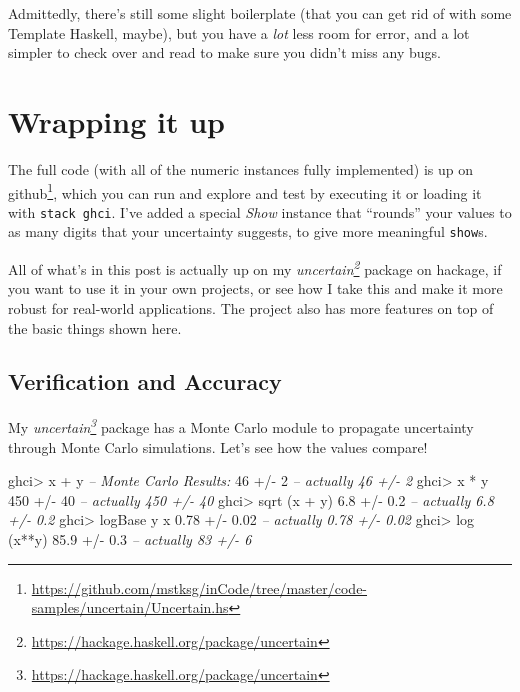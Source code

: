 \documentclass[]{article}
\newenvironment{Shaded}{}{}
\newcommand{\DecValTok}[1]{\textcolor[rgb]{0.25,0.63,0.44}{{#1}}}
\newcommand{\FloatTok}[1]{\textcolor[rgb]{0.25,0.63,0.44}{{#1}}}
\newcommand{\CommentTok}[1]{\textcolor[rgb]{0.38,0.63,0.69}{\textit{{#1}}}}
\newcommand{\FunctionTok}[1]{\textcolor[rgb]{0.02,0.16,0.49}{{#1}}}
\newcommand{\NormalTok}[1]{{#1}}
\renewcommand{\href}[2]{#2\footnote{\url{#1}}}
\begin{document}
Admittedly, there's still some slight boilerplate (that you can get rid of with
some Template Haskell, maybe), but you have a \emph{lot} less room for error,
and a lot simpler to check over and read to make sure you didn't miss any bugs.

\section{Wrapping it up}\label{wrapping-it-up}

The full code (with all of the numeric instances fully implemented) is up
\href{https://github.com/mstksg/inCode/tree/master/code-samples/uncertain/Uncertain.hs}{on
github}, which you can run and explore and test by executing it or loading it
with \texttt{stack\ ghci}. I've added a special \emph{Show} instance that
``rounds'' your values to as many digits that your uncertainty suggests, to give
more meaningful \texttt{show}s.

All of what's in this post is actually up on my
\emph{\href{https://hackage.haskell.org/package/uncertain}{uncertain}} package
on hackage, if you want to use it in your own projects, or see how I take this
and make it more robust for real-world applications. The project also has more
features on top of the basic things shown here.

\subsection{Verification and Accuracy}\label{verification-and-accuracy}

My \emph{\href{https://hackage.haskell.org/package/uncertain}{uncertain}}
package has a Monte Carlo module to propagate uncertainty through Monte Carlo
simulations. Let's see how the values compare!

\begin{Shaded}
\begin{Highlighting}[]
\NormalTok{ghci}\FunctionTok{>} \NormalTok{x }\FunctionTok{+} \NormalTok{y         }\CommentTok{-- Monte Carlo Results:}
\DecValTok{46} \FunctionTok{+/-} \DecValTok{2}            \CommentTok{-- actually 46 +/- 2}
\NormalTok{ghci}\FunctionTok{>} \NormalTok{x }\FunctionTok{*} \NormalTok{y}
\DecValTok{450} \FunctionTok{+/-} \DecValTok{40}          \CommentTok{-- actually 450 +/- 40}
\NormalTok{ghci}\FunctionTok{>} \NormalTok{sqrt (x }\FunctionTok{+} \NormalTok{y)}
\FloatTok{6.8} \FunctionTok{+/-} \FloatTok{0.2}         \CommentTok{-- actually 6.8 +/- 0.2}
\NormalTok{ghci}\FunctionTok{>} \NormalTok{logBase y x}
\FloatTok{0.78} \FunctionTok{+/-} \FloatTok{0.02}       \CommentTok{-- actually 0.78 +/- 0.02}
\NormalTok{ghci}\FunctionTok{>} \NormalTok{log (x}\FunctionTok{**}\NormalTok{y)}
\FloatTok{85.9} \FunctionTok{+/-} \FloatTok{0.3}        \CommentTok{-- actually 83 +/- 6}
\end{Highlighting}
\end{Shaded}
\end{document}

